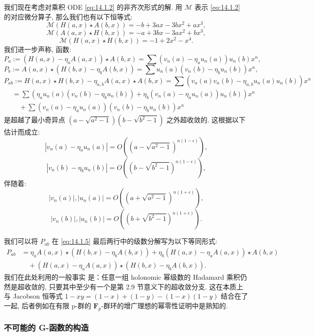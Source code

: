 我们现在考虑对乘积 ODE \eqref{eq:14.1.2} 的非齐次形式的解. 
用 \(\mathcal{M}\) 表示 \eqref{eq:14.1.2} 的对应微分算子, 
那么我们也有以下恒等式:
\[ \mathcal{M}(H(a,x) \star A(b,x)) = -b + 3ax - 3bx^{2} + ax^{3}, \]
\[ \mathcal{M}(A(a,x) \star H(b,x)) = -a + 3bx - 3ax^{2} + bx^{3}, \]
\[ \mathcal{M}(H(a,x) \star H(b,x)) = -1 + 2x^{2} - x^{4}. \]
我们进一步声称, 函数:
\begin{equation}\label{eq:14.1.5}
P_{a} := (H(a,x) - \eta_{a}A(a,x)) \star A(b,x) = \sum (v_{n}(a) - \eta_{a}u_{n}(a))u_{n}(b)x^{n},
\end{equation}
\[ P_{b} := A(a,x) \star (H(b,x) - \eta_{b}A(b,x)) = \sum u_{n}(a)(v_{n}(b) - \eta_{b}u_{n}(b))x^{n}, \]
\[ P_{ab} := H(a,x) \star H(b,x) - \eta_{a,b}A(a,x) \star A(b,x) = \sum (v_{n}(a)v_{n}(b) - \eta_{a,b}u_{n}(a)u_{n}(b))x^{n} \]
\[
\begin{aligned}
&= \sum \left( \eta_{a}u_{n}(a)(v_{n}(b) - \eta_{b}u_{n}(b)) + \eta_{b}(v_{n}(a) - \eta_{a}u_{n}(a))u_{n}(b) \right) x^{n} \\
&\quad + \sum (v_{n}(a) - \eta_{a}u_{n}(a))(v_{n}(b) - \eta_{b}u_{n}(b))x^{n}
\end{aligned}
\]
是超越了最小奇异点 \((a - \sqrt{a^2 - 1})(b - \sqrt{b^2 - 1})\) 之外超收敛的. 
这根据以下估计而成立:
\[ |v_n(a) - \eta_a u_n(a)| = O((a - \sqrt{a^2 - 1})^{n(1 - \epsilon)}), \]
\[ |v_n(b) - \eta_b u_n(b)| = O((b - \sqrt{b^2 - 1})^{n(1 - \epsilon)}), \]
伴随着:
\[ |v_n(a)|, |u_n(a)| = O((a + \sqrt{a^2 - 1})^{n(1+\epsilon)}), \]
\[ |v_n(b)|, |u_n(b)| = O((b + \sqrt{b^2 - 1})^{n(1+\epsilon)}). \]

我们可以将 \(P_{ab}\) 在 \eqref{eq:14.1.5} 最后两行中的级数分解写为以下等同形式:
\[
\begin{aligned}
P_{ab} &= \eta_a A(a, x) \star (H(b, x) - \eta_b A(b, x)) + \eta_b (H(a, x) - \eta_a A(a, x)) \star A(b, x) \\
&\quad + (H(a, x) - \eta_a A(a, x)) \star (H(b, x) - \eta_b A(b, x)).
\end{aligned}
\]
我们在此处利用的一般事实 \cite{Her1893} 是：任意一组 holonomic 幂级数的 Hadamard 乘积仍然是超收敛的, 
只要其中至少有一个是第 2.9 节意义下的超收敛分支. 
这在本质上与 Jacobson 恒等式 \(1-xy=(1-x)+(1-y)-(1-x)(1-y)\) 结合在了一起, 
后者例如在有限 p-群的 \(\mathbf{F}_p\)-群环的增广理想的幂零性证明中是熟知的.

\subsubsection{不可能的 G-函数的构造}\label{sec:14.1.6}

